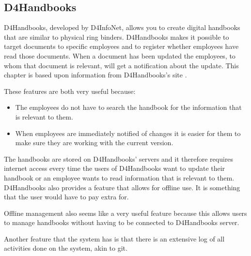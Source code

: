 \subsection{D4Handbooks}
D4Handbooks, developed by D4InfoNet, allows you to create digital handbooks that are similar to physical ring binders.
D4Handbooks makes it possible to target documents to specific employees and to register whether employees have read those documents.
When a document has been updated the employees, to whom that document is relevant, will get a notification about the update.
This chapter is based upon information from D4Handbooks's site \cite{D4Handbook}.

These features are both very useful because:

\begin{itemize}
        \item
        The employees do not have to search the handbook for the information that is relevant to them.
        \item
        When employees are immediately notified of changes it is easier for them to make sure they are working with the current version.
\end{itemize}

The handbooks are stored on D4Handbooks' servers and it therefore requires internet access every time the users of D4Handbooks want to update their handbook or an employee wants to read information that is relevant to them.
D4Handbooks also provides a feature that allows for offline use. It is something that the user would have to pay extra for.

Offline management also seems like a very useful feature because this allows users to manage handbooks without having to be connected to D4Handbooks server.

Another feature that the system has is that there is an extensive log of all activities done on the system, akin to git.
